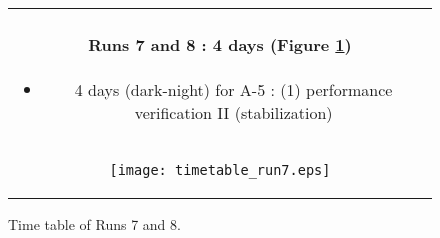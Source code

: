 \begin{figure}[!ht]
\begin{center}
\begin{tabular}{c}
\begin{minipage}{0.95\hsize}
\paragraph{Runs 7 and 8 : 4 days  (Figure \ref{fig:run7})}
	\begin{itemize}
	\item 4 days (dark-night) for A-5 :
	(1) performance verification II (stabilization)
	\end{itemize}
\end{minipage} \\
\begin{minipage}{0.8\hsize}
	\begin{center}
	\vspace*{5mm}
	\texttt{[image: timetable\_run7.eps]}
	\end{center}
	\vspace*{-5mm}
	\caption{Time table of Runs 7 and 8.}
	\label{fig:run7}
\end{minipage}
\end{tabular}
\end{center}
\end{figure}


